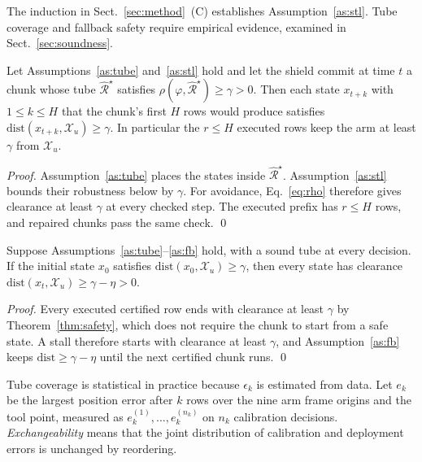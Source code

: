 \documentclass[runningheads]{llncs}
\newcommand{\Rh}{\hat{\mathcal{R}}}
\newcommand{\Xu}{\mathcal{X}_u}
\begin{document}
The induction in Sect.~\ref{sec:method}~(C) establishes
Assumption~\ref{as:stl}. Tube coverage and fallback safety require empirical
evidence, examined in Sect.~\ref{sec:soundness}.

\begin{theorem}\label{thm:safety}
Let Assumptions~\ref{as:tube} and~\ref{as:stl} hold and let the shield
commit at time $t$ a chunk whose tube $\Rh^\star$ satisfies
$\rho(\varphi, \Rh^\star) \ge \gamma > 0$.
Then each state $x_{t+k}$ with $1 \le k \le H$ that the chunk's first $H$
rows would produce satisfies $\mathrm{dist}(x_{t+k}, \Xu) \ge \gamma$. In particular the
$r \le H$ executed rows keep the arm at least $\gamma$ from $\Xu$.
\end{theorem}
\begin{proof}
Assumption~\ref{as:tube} places the states inside $\Rh^\star$.
Assumption~\ref{as:stl} bounds their robustness below by $\gamma$.
For avoidance, Eq.~\eqref{eq:rho} therefore gives clearance at least
$\gamma$ at every checked step.
The executed prefix has $r\le H$ rows, and repaired chunks pass the
same check. \qed

\end{proof}

\begin{corollary}\label{cor:alltime}
Suppose Assumptions~\ref{as:tube}--\ref{as:fb} hold, with a sound tube
at every decision. If the initial state $x_0$ satisfies
$\mathrm{dist}(x_0,\Xu)\ge\gamma$, then every state has clearance
$\mathrm{dist}(x_t,\Xu)\ge\gamma-\eta>0$.
\end{corollary}
\begin{proof}
Every executed certified row ends with clearance at least $\gamma$ by
Theorem~\ref{thm:safety}, which does not require the chunk to start from a
safe state. A stall therefore starts with clearance at least $\gamma$, and
Assumption~\ref{as:fb} keeps $\mathrm{dist} \ge \gamma - \eta$ until the next
certified chunk runs. \qed
\end{proof}

Tube coverage is statistical in practice because $\epsilon_k$ is estimated
from data.
Let $e_k$ be the largest position error after $k$ rows over the nine arm
frame origins and the tool point, measured as
$e_k^{(1)},\dots,e_k^{(n_k)}$ on $n_k$ calibration decisions.
\emph{Exchangeability} means that the joint distribution of calibration and
deployment errors is unchanged by reordering.
\end{document}
